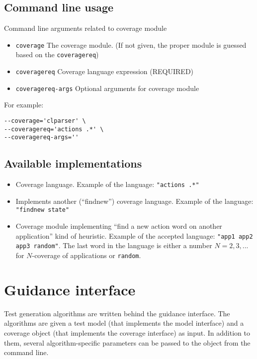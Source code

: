 \documentclass{article}
\begin{document}
\subsection{Command line usage}

Command line arguments related to coverage module
\begin{itemize}
\item \texttt{coverage}
    The coverage module. (If not given, the proper module is guessed based
    on the \texttt{coveragereq})
\item \texttt{coveragereq} Coverage language expression (REQUIRED)
\item \texttt{coveragereq-args} Optional arguments for coverage module
\end{itemize}

For example:
\begin{verbatim}
--coverage='clparser' \
--coveragereq='actions .*' \
--coveragereq-args=''
\end{verbatim}

\subsection{Available implementations}

\begin{itemize}
\item {}
  Coverage language.
  Example of the language: \texttt{"actions .*"}
\item {}
  Implements another (``findnew'') coverage language.
  Example of the language: \texttt{"findnew state"}
\item \modulename{altercoverage}
  Coverage module implementing ``find a new action word on another application''
  kind of heuristic.
  Example of the accepted language: \texttt{"app1 app2 app3 random"}.
  The last word in the language is either a number $N=2,3,...$ for
  $N$-coverage of applications or \texttt{random}.
\end{itemize}

\section{Guidance interface}

Test generation algorithms are written behind the guidance
interface. The algorithms are given a test model (that implements the
model interface) and a coverage object (that implements the coverage
interface) as input. In addition to them, several algorithm-specific
parameters can be passed to the object from the command line.
\end{document}
